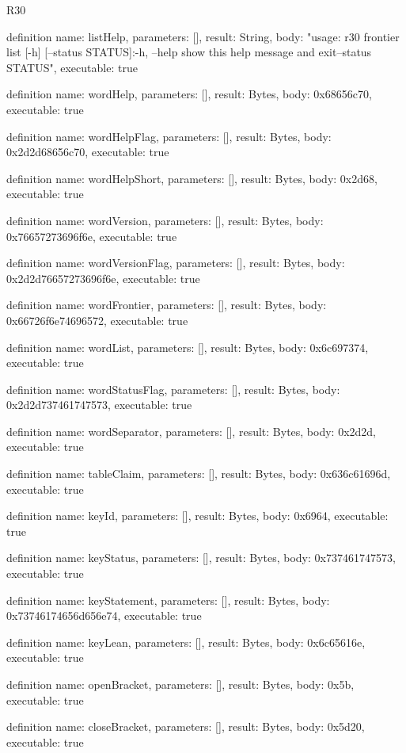 \begin{lexlean}{R30}
\begin{semanticmodule}
definition{
  name: listHelp,
  parameters: [],
  result: String,
  body: "usage: r30 frontier list [-h] [--status STATUS]\n\noptions:\n  -h, --help       show this help message and exit\n  --status STATUS\n",
  executable: true
}

definition{
  name: wordHelp,
  parameters: [],
  result: Bytes,
  body: 0x68656c70,
  executable: true
}

definition{
  name: wordHelpFlag,
  parameters: [],
  result: Bytes,
  body: 0x2d2d68656c70,
  executable: true
}

definition{
  name: wordHelpShort,
  parameters: [],
  result: Bytes,
  body: 0x2d68,
  executable: true
}

definition{
  name: wordVersion,
  parameters: [],
  result: Bytes,
  body: 0x76657273696f6e,
  executable: true
}

definition{
  name: wordVersionFlag,
  parameters: [],
  result: Bytes,
  body: 0x2d2d76657273696f6e,
  executable: true
}

definition{
  name: wordFrontier,
  parameters: [],
  result: Bytes,
  body: 0x66726f6e74696572,
  executable: true
}

definition{
  name: wordList,
  parameters: [],
  result: Bytes,
  body: 0x6c697374,
  executable: true
}

definition{
  name: wordStatusFlag,
  parameters: [],
  result: Bytes,
  body: 0x2d2d737461747573,
  executable: true
}

definition{
  name: wordSeparator,
  parameters: [],
  result: Bytes,
  body: 0x2d2d,
  executable: true
}

definition{
  name: tableClaim,
  parameters: [],
  result: Bytes,
  body: 0x636c61696d,
  executable: true
}

definition{
  name: keyId,
  parameters: [],
  result: Bytes,
  body: 0x6964,
  executable: true
}

definition{
  name: keyStatus,
  parameters: [],
  result: Bytes,
  body: 0x737461747573,
  executable: true
}

definition{
  name: keyStatement,
  parameters: [],
  result: Bytes,
  body: 0x73746174656d656e74,
  executable: true
}

definition{
  name: keyLean,
  parameters: [],
  result: Bytes,
  body: 0x6c65616e,
  executable: true
}

definition{
  name: openBracket,
  parameters: [],
  result: Bytes,
  body: 0x5b,
  executable: true
}

definition{
  name: closeBracket,
  parameters: [],
  result: Bytes,
  body: 0x5d20,
  executable: true
}


\end{semanticmodule}
\end{lexlean}
